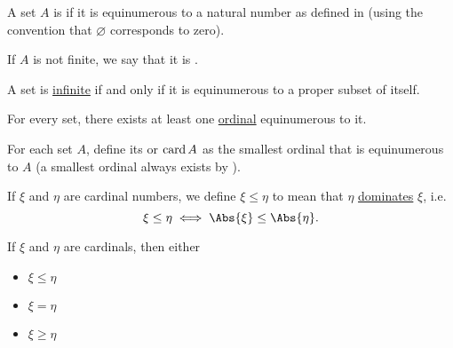 \begin{definition}\label{def:finite_set}
  A set \( A \) is  if it is equinumerous to a natural number as defined in  (using the convention that \( \varnothing \) corresponds to zero).

  If \( A \) is not finite, we say that it is .
\end{definition}

\begin{proposition}\label{thm:infinite_set_iff_equinumerous_to_proper_subset}
  A set is \hyperref[def:finite_set]{infinite} if and only if it is equinumerous to a proper subset of itself.
\end{proposition}

\begin{theorem}\label{thm:equinumerous_ordinal_existence}
  For every set, there exists at least one \hyperref[def:ordinal]{ordinal} equinumerous to it.
\end{theorem}

\medskip

\begin{definition}\label{def:cardinal}
  For each set \( A \), define its  or  \( \operatorname{card} A \) as the smallest ordinal that is equinumerous to \( A \) (a smallest ordinal always exists by ).

  If \( \xi \) and \( \eta \) are cardinal numbers, we define \( \xi \leq \eta \) to mean that \( \eta \) \hyperref[def:set_domination]{dominates} \( \xi \), i.e.
  \begin{equation*}
    \xi \leq \eta \iff \Abs{\xi} \leq \Abs{\eta}.
  \end{equation*}
\end{definition}

\begin{theorem}\label{thm:cardinal_trichotomy}
  If \( \xi \) and \( \eta \) are cardinals, then either
  \begin{itemize}
    \item \( \xi \leq \eta \)
    \item \( \xi = \eta \)
    \item \( \xi \geq \eta \)
  \end{itemize}
\end{theorem}

